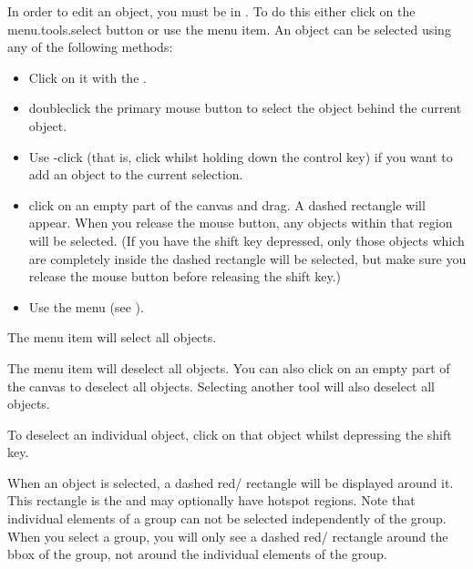 In order to edit an \gls{object}, you must be in \selectmode. To do
this either click on the \gls{menu.tools.select} button or use the 
 menu item. An \gls*{object} can
be selected using any of the following methods:
\begin{itemize}
\item Click on it with the .

\item \Gls{doubleclick} the primary mouse button to
select the \gls*{object} behind the current \gls*{object}.

\item Use -click (that is, \gls{click} whilst holding down the control
 key) if you want to add an \gls*{object} to the current
selection.

\item \Gls{click} on an empty part of the \gls{canvas} and
drag. A dashed rectangle will appear. When you release the mouse
button, any \glspl*{object} within that
region will be selected. (If you have the shift  key depressed,
only those objects which are completely inside the dashed
rectangle will be selected, but make sure you release the mouse
button before releasing the shift key.)

\item Use the  menu (see ).

\end{itemize}


The  menu item will select all
\glspl{object}.


The  menu item will deselect all
\glspl{object}. You can also click on
an empty part of the \gls{canvas} to deselect all \glspl{object}.
Selecting another tool will also deselect all \glspl*{object}.

\begin{information}
To deselect an individual \gls*{object}, click on that object whilst
depressing the shift  key.
\end{information}

When an \gls{object} is selected, a dashed red\slash{}
rectangle will be displayed around it. This rectangle is the 
\emph{} and may optionally have
\gls{hotspot} regions. Note that individual elements of a
\gls{group} can not be selected independently of the group.  When
you select a group, you will only see a dashed
red\slash{} rectangle around the \gls{bbox} of the group,
not around the individual elements of the group.

